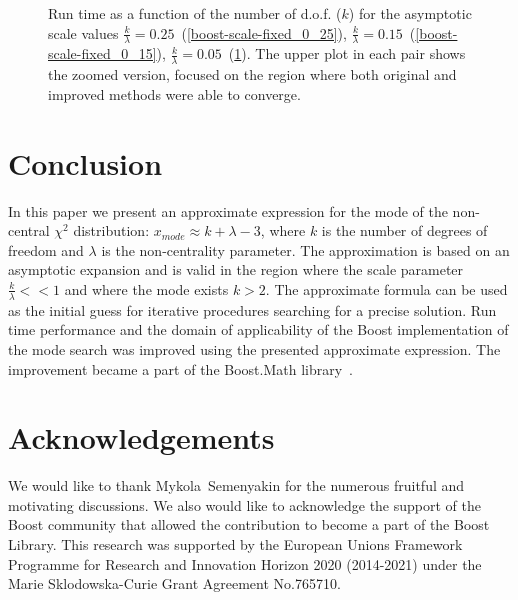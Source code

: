 \documentclass{amsart}
\numberwithin{equation}{section}
\begin{document}
\begin{figure}[t]
\begin{subfigure}[t]{0.3\textwidth}
		\caption{}\label{boost-scale-fixed_0_05}
	\end{subfigure}
    \caption{Run time as a function of the number of d.o.f. ($k$) for the asymptotic scale values $\frac{k}{\lambda}=0.25$~(\ref{boost-scale-fixed_0_25}), $\frac{k}{\lambda}=0.15$~(\ref{boost-scale-fixed_0_15}), $\frac{k}{\lambda}=0.05$~(\ref{boost-scale-fixed_0_05}). The upper plot in each pair shows the zoomed version, focused on the region where both original and improved methods were able to converge.}\label{fig:boost-scale-fixed}
\end{figure}

\section{Conclusion}
In this paper we present an approximate expression for the mode of the non-central $\chi^2$ distribution: $x_{mode} \approx k + \lambda - 3$, where $k$ is the number of degrees of freedom and $\lambda$ is the non-centrality parameter. The approximation is based on an asymptotic expansion and is valid in the region where the scale parameter $\frac{k}{\lambda} << 1$ and where the mode exists $k > 2$. The approximate formula can be used as the initial guess for iterative procedures searching for a precise solution. Run time performance and the domain of applicability of the Boost implementation of the mode search was improved using the presented approximate expression. The improvement became a part of the Boost.Math library~\cite{gbench-script}.

\section{Acknowledgements}
We would like to thank Mykola~Semenyakin for the numerous fruitful and motivating discussions. We also would like to acknowledge the support of the Boost community that allowed the contribution to become a part of the Boost Library. This research was supported by the European Unions Framework Programme for Research and Innovation Horizon 2020 (2014-2021) under the Marie Sklodowska-Curie Grant Agreement No.765710.
\end{document}
